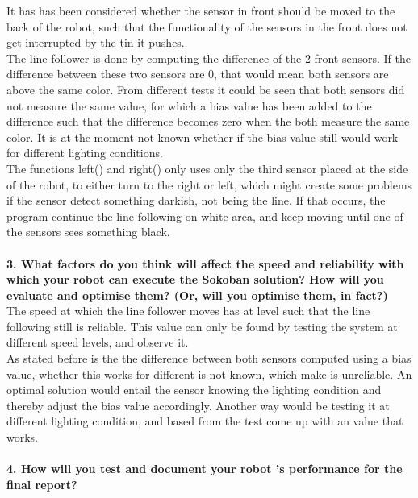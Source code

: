 \documentclass[10pt,a4paper]{article}
\begin{document}
It has has been considered  whether the sensor in front should be moved to the back of the robot, such that the functionality of the sensors in the front does not get interrupted by the tin it pushes. \\


The line follower is done by computing the difference of the 2 front sensors.  If the difference between these two sensors are 0, that would mean both sensors are above the same color.    From different tests it could be seen that both sensors did not measure the same value, for which a bias value has been added to the difference such that the difference becomes zero when the both measure the same color.  It is at the moment not known whether if the bias value still would work for different lighting conditions.\\

The functions left() and right() only uses only the third sensor placed at the side of the robot, to either turn to the right or left,  which might create some problems if the sensor detect something darkish, not being the line.  If that occurs, the program continue the line following on white area, and keep moving until one of the sensors sees something black.\\\\
 
\textbf{3.  What factors do you think will affect the speed and reliability with which your
     robot can execute the Sokoban solution?  How will you evaluate and optimise them?
     (Or, will you optimise them, in fact?)}\\
     

		The speed at which the line follower moves has at level such that the line following still is reliable.   This value can only be found by testing the system at different speed levels, and observe it.\\
		
		As stated before is the the difference between both sensors computed using a bias value, whether this works for different is not known, which make is unreliable. An optimal solution would entail the sensor knowing the lighting condition and thereby adjust  the bias value accordingly.  Another way would be testing it at different lighting condition, and based from the test come up with an value that works. \\\\
		\textbf{4.  How will you test and document your robot
		's performance for the final report?}\\\\
\end{document}
